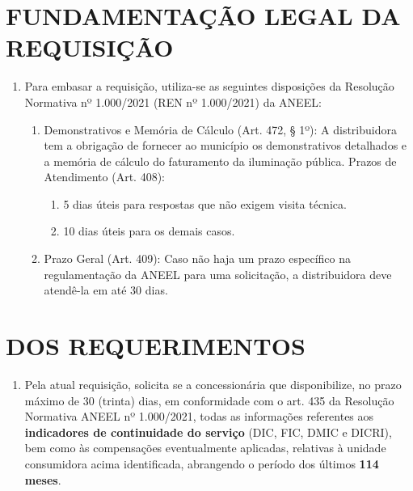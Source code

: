 \newcommand{\tipoRequerimento}{Solicitação de informação sobre os Indicadores de Continuidade}

\section{FUNDAMENTAÇÃO LEGAL DA REQUISIÇÃO}

\begin{enumerate}[resume]
\item
  Para embasar a requisição, utiliza-se as seguintes disposições da Resolução Normativa nº 1.000/2021 (REN nº 1.000/2021) da ANEEL:
  \begin{enumerate}
  \item
    Demonstrativos e Memória de Cálculo (Art. 472, § 1º): A distribuidora tem a obrigação de fornecer ao município os demonstrativos detalhados e a memória de cálculo do faturamento da iluminação pública. Prazos de Atendimento (Art. 408):
    \begin{enumerate}
      \item  
      5 dias úteis para respostas que não exigem visita técnica.
      \item 
      10 dias úteis para os demais casos.
    \end{enumerate}
  \item 
  Prazo Geral (Art. 409): Caso não haja um prazo específico na regulamentação da ANEEL para uma solicitação, a distribuidora deve atendê-la em até 30 dias.
  \end{enumerate}
\end{enumerate}

\section{DOS REQUERIMENTOS}

\begin{enumerate}[resume]
\item Pela atual requisição, solicita se a concessionária que disponibilize, no prazo máximo de 30 (trinta) dias, em conformidade com o art. 435 da Resolução Normativa ANEEL nº 1.000/2021, todas as informações referentes aos \textbf{indicadores de continuidade do serviço} (DIC, FIC, DMIC e DICRI), bem como às compensações eventualmente aplicadas, relativas à unidade consumidora acima identificada, abrangendo o período dos últimos \textbf{114 meses}.
\end{enumerate}
